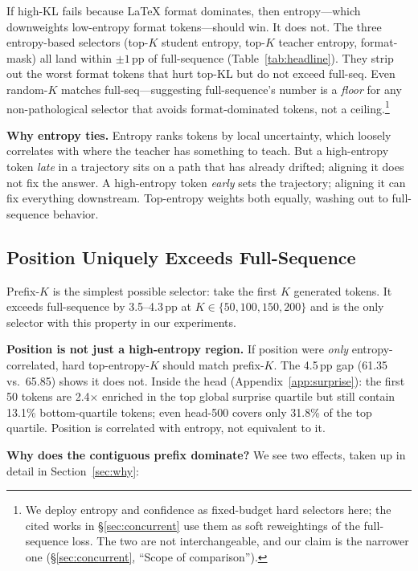 \documentclass[10pt]{article}
\begin{document}
If high-KL fails because LaTeX format dominates, then entropy---which downweights low-entropy format tokens---should win. It does not. The three entropy-based selectors (top-$K$ student entropy, top-$K$ teacher entropy, format-mask) all land within $\pm 1$\,pp of full-sequence (Table~\ref{tab:headline}). They strip out the worst format tokens that hurt top-KL but do not exceed full-seq. Even random-$K$ matches full-seq---suggesting full-sequence's number is a \emph{floor} for any non-pathological selector that avoids format-dominated tokens, not a ceiling.\footnote{We deploy entropy and confidence as fixed-budget hard selectors here; the cited works in \S\ref{sec:concurrent} use them as soft reweightings of the full-sequence loss. The two are not interchangeable, and our claim is the narrower one (\S\ref{sec:concurrent}, ``Scope of comparison'').}


\textbf{Why entropy ties.} Entropy ranks tokens by local uncertainty, which loosely correlates with where the teacher has something to teach. But a high-entropy token \emph{late} in a trajectory sits on a path that has already drifted; aligning it does not fix the answer. A high-entropy token \emph{early} sets the trajectory; aligning it can fix everything downstream. Top-entropy weights both equally, washing out to full-sequence behavior.

\subsection{Position Uniquely Exceeds Full-Sequence}
\label{sec:position_wins}

Prefix-$K$ is the simplest possible selector: take the first $K$ generated tokens. It exceeds full-sequence by 3.5--4.3\,pp at $K \in \{50,100,150,200\}$ and is the only selector with this property in our experiments.

\textbf{Position is not just a high-entropy region.} If position were \emph{only} entropy-correlated, hard top-entropy-$K$ should match prefix-$K$. The 4.5\,pp gap (61.35 vs.\ 65.85) shows it does not. Inside the head (Appendix~\ref{app:surprise}): the first 50 tokens are 2.4$\times$ enriched in the top global surprise quartile but still contain 13.1\% bottom-quartile tokens; even head-500 covers only 31.8\% of the top quartile. Position is correlated with entropy, not equivalent to it.

\textbf{Why does the contiguous prefix dominate?} We see two effects, taken up in detail in Section~\ref{sec:why}:
\end{document}
